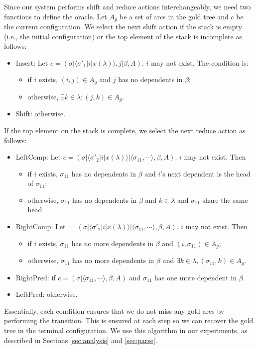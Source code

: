\documentclass[english]{jnlp_1.4}
\begin{document}
Since our system performs shift and reduce actions interchangeably, we need two functions to define the oracle.
Let $A_g$ be a set of arcs in the gold tree and $c$ be the current configuration.
We select the next shift action if the stack is empty (i.e., the initial configuration) or the top element of the stack is incomplete as follows:
\begin{itemize}
 \item {\sc Insert}:
       Let $c=(\sigma| \langle \sigma'_1 | i | x(\lambda) \rangle, j|\beta, A)$. $i$ may not exist.
       The condition is:
\begin{itemize}
        \item if $i$ exists, $(i,j)\in A_g$ and $j$ has no dependents in $\beta$;
        \item otherwise, $\exists k\in \lambda;(j,k)\in A_g$.
       \end{itemize}
 \item {\sc Shift}: otherwise.
\end{itemize}
If the top element on the stack is complete, we select the next reduce action as follows:
\begin{itemize}
 \item {\sc LeftComp}:
       Let $c=(\sigma| \langle \sigma'_2 | i | x(\lambda) \rangle | \langle \sigma_{11},\cdots \rangle, \beta, A)$. $i$ may not exist.
       Then
       \begin{itemize}
        \item if $i$ exists, $\sigma_{11}$ has no dependents in $\beta$ and $i$'s next dependent is the head of $\sigma_{11}$;
        \item otherwise, $\sigma_{11}$ has no dependents in $\beta$ and $k\in\lambda$ and $\sigma_{11}$ share the same head.
       \end{itemize}
 \item {\sc RightComp}:
       Let $=(\sigma| \langle \sigma'_2 | i | x(\lambda) \rangle | \langle \sigma_{11},\cdots \rangle, \beta, A)$. $i$ may not exist.
       Then
\begin{itemize}
        \item if $i$ exists, $\sigma_{11}$ has no more dependents in $\beta$ and $(i,\sigma_{11}) \in A_g$;
        \item otherwise, $\sigma_{11}$ has no more dependents in $\beta$ and $\exists k\in \lambda,(\sigma_{11},k)\in A_g$.
       \end{itemize}
 \item {\sc RightPred}: if $c=(\sigma| \langle \sigma_{11},\cdots \rangle, \beta, A)$ and $\sigma_{11}$ has one more dependent in $\beta$.
 \item {\sc LeftPred}: otherwise.
\end{itemize}
Essentially, each condition ensures that we do not miss any gold arcs by performing the transition.
This is ensured at each step so we can recover the gold tree in the terminal configuration.
We use this algorithm in our experiments, as described in Sections \ref{sec:analysis} and \ref{sec:parse}.
\end{document}
